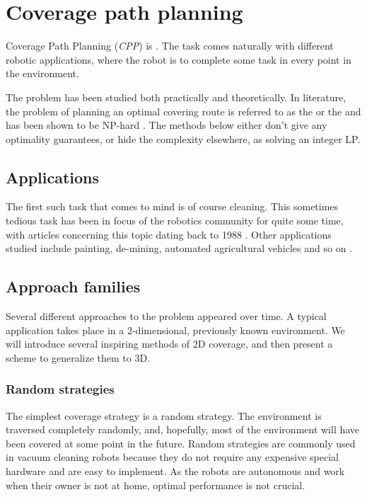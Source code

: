 \documentclass[buriama8_dp.tex]{subfiles}
\begin{document}
\chapter{Coverage path planning}
\label{chap:cpp}

Coverage Path Planning (\textit{CPP}) is . The task comes naturally with different robotic applications, where the robot is to complete some task in every point in the environment.

The problem has been studied both practically and theoretically. In literature, the problem of planning an optimal covering route is referred to as the  or the  and has been shown to be NP-hard \cite{lawnmowing}. The methods below either don't give any optimality guarantees, or hide the complexity elsewhere, as solving an integer LP.

\section{Applications}
The first such task that comes to mind is of course cleaning. This sometimes tedious task has been in focus of the robotics community for quite some time, with articles concerning this topic dating back to 1988 \cite{cleaning88}. Other applications studied include painting, de-mining, automated agricultural vehicles and so on \cite[sec.~1]{survey13}.


\section{Approach families}

Several different approaches to the problem appeared over time. A typical application takes place in a 2-dimensional, previously known environment. We will introduce several inspiring methods of 2D coverage, and then present a scheme to generalize them to 3D.


\subsection{Random strategies}
\label{subsec:random_cpp}
The simplest coverage strategy is a random strategy. The environment is traversed completely randomly, and, hopefully, most of the environment will have been covered at some point in the future. Random strategies are commonly used in vacuum cleaning robots because they do not require any expensive special hardware and are easy to implement. As the robots are autonomous and work when their owner is not at home, optimal performance is not crucial.
\end{document}
